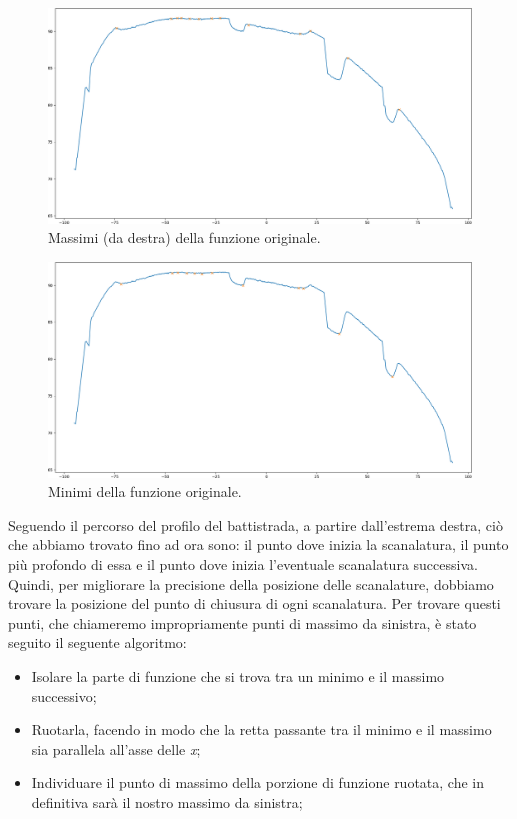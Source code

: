 \begin{figure}[H]
	\centering
	\includegraphics[width=0.9\columnwidth]{./pictures/batt_2_analisi_6.png}
	\caption{Massimi (da destra) della funzione originale.}\label{fig:batt_2_analisi_6}
\end{figure}

\begin{figure}[H]
	\centering
	\includegraphics[width=0.9\columnwidth]{./pictures/batt_2_analisi_7.png}
	\caption{Minimi della funzione originale.}\label{fig:batt_2_analisi_7}
\end{figure}

\noindent Seguendo il percorso del profilo del battistrada, a partire dall'estrema destra, ciò che abbiamo trovato fino ad ora sono: il punto dove inizia la scanalatura, il punto più profondo di essa e il punto dove inizia l'eventuale scanalatura successiva.\\
\newline
Quindi, per migliorare la precisione della posizione delle scanalature, dobbiamo trovare la posizione del punto di chiusura di ogni scanalatura.
\newpage
\noindent Per trovare questi punti, che chiameremo impropriamente punti di massimo da sinistra, è stato seguito il seguente algoritmo:

\begin{itemize}
	\item Isolare la parte di funzione che si trova tra un minimo e il massimo successivo;
	\item Ruotarla, facendo in modo che la retta passante tra il minimo e il massimo sia parallela all'asse delle \textit{x};
	\item Individuare il punto di massimo della porzione di funzione ruotata, che in definitiva sarà il nostro massimo da sinistra;
\end{itemize}

